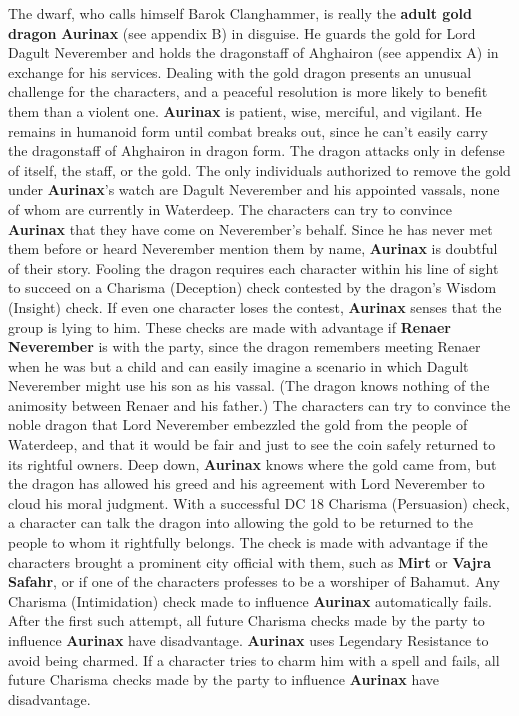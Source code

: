 \documentclass[10pt,a4paper,twoside,twocolumn,openany,nodeprecatedcode]{dndbook}
\begin{document}
The dwarf, who calls himself Barok Clanghammer, is really the \textbf{adult gold dragon} \textbf{Aurinax} (see appendix B) in disguise. He guards the gold for Lord Dagult Neverember and holds the dragonstaff of Ahghairon (see appendix A) in exchange for his services. Dealing with the gold dragon presents an unusual challenge for the characters, and a peaceful resolution is more likely to benefit them than a violent one.
\textbf{Aurinax} is patient, wise, merciful, and vigilant. He remains in humanoid form until combat breaks out, since he can't easily carry the dragonstaff of Ahghairon in dragon form. The dragon attacks only in defense of itself, the staff, or the gold. The only individuals authorized to remove the gold under \textbf{Aurinax}'s watch are Dagult Neverember and his appointed vassals, none of whom are currently in Waterdeep.
The characters can try to convince \textbf{Aurinax} that they have come on Neverember's behalf. Since he has never met them before or heard Neverember mention them by name, \textbf{Aurinax} is doubtful of their story. Fooling the dragon requires each character within his line of sight to succeed on a Charisma (Deception) check contested by the dragon's Wisdom (Insight) check. If even one character loses the contest, \textbf{Aurinax} senses that the group is lying to him. These checks are made with advantage if \textbf{Renaer Neverember} is with the party, since the dragon remembers meeting Renaer when he was but a child and can easily imagine a scenario in which Dagult Neverember might use his son as his vassal. (The dragon knows nothing of the animosity between Renaer and his father.)
The characters can try to convince the noble dragon that Lord Neverember embezzled the gold from the people of Waterdeep, and that it would be fair and just to see the coin safely returned to its rightful owners. Deep down, \textbf{Aurinax} knows where the gold came from, but the dragon has allowed his greed and his agreement with Lord Neverember to cloud his moral judgment. With a successful DC 18 Charisma (Persuasion) check, a character can talk the dragon into allowing the gold to be returned to the people to whom it rightfully belongs. The check is made with advantage if the characters brought a prominent city official with them, such as \textbf{Mirt} or \textbf{Vajra Safahr}, or if one of the characters professes to be a worshiper of Bahamut.
Any Charisma (Intimidation) check made to influence \textbf{Aurinax} automatically fails. After the first such attempt, all future Charisma checks made by the party to influence \textbf{Aurinax} have disadvantage.
\textbf{Aurinax} uses Legendary Resistance to avoid being charmed. If a character tries to charm him with a spell and fails, all future Charisma checks made by the party to influence \textbf{Aurinax} have disadvantage.
\end{document}
